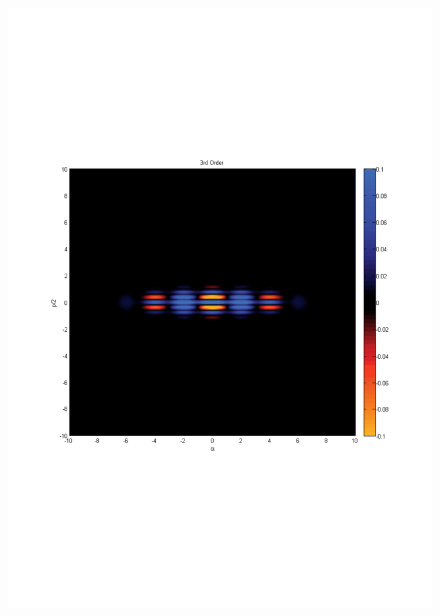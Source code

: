 \documentclass[aps,prl,twocolumn,amsmath,amssymb,nofootinbib,superscriptaddress]{revtex4}
\begin{document}
\begin{figure}[!htb]
\includegraphics[scale=0.35]{3rdOrder.pdf}\\

\end{figure}
\end{document}
